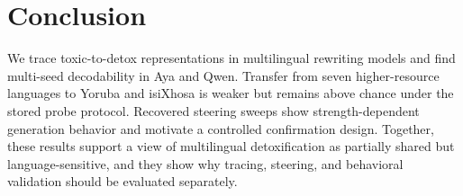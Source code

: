 \section{Conclusion}

We trace toxic-to-detox representations in multilingual rewriting models and find
multi-seed decodability in Aya and Qwen. Transfer from seven higher-resource languages
to Yoruba and isiXhosa is weaker but remains above chance under the stored probe
protocol. Recovered steering sweeps show strength-dependent generation behavior and
motivate a controlled confirmation design. Together, these results support a view of
multilingual detoxification as partially shared but language-sensitive, and they show
why tracing, steering, and behavioral validation should be evaluated separately.
